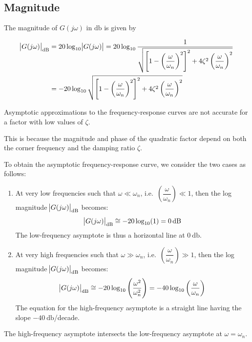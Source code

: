\documentclass[
  14pt,
  a4paper,
  oneside,
  open=any,
  a4paper,
  14pt]{report}
\begin{document}
\subsection{Magnitude}\label{magnitude-2}

The magnitude of \(G(j\omega)\) in \(\unit{\decibel}\) is given by

\[
\begin{aligned}
    \abs{G(j\omega)}_{\unit{\decibel}} &= 20\log_{10}\abs{G(j\omega)} = 20\log_{10}\dfrac{1}{\sqrt{\left[1-\left(\dfrac{\omega}{\omega_n}\right)^2 \right]^2 + 4\zeta^2\left(\dfrac{\omega}{\omega_n}\right)^2}} \\
    &= -20\log_{10}\sqrt{\left[1-\left(\dfrac{\omega}{\omega_n}\right)^2 \right]^2 + 4\zeta^2\left(\dfrac{\omega}{\omega_n}\right)^2}
\end{aligned}
\]

Asymptotic approximations to the frequency-response curves are not
accurate for a factor with low values of \(\zeta\).

This is because the magnitude and phase of the quadratic factor depend
on both the corner frequency and the damping ratio \(\zeta\).

To obtain the asymptotic frequency-response curve, we consider the two
cases as follows:

\begin{enumerate}
\def\labelenumi{\arabic{enumi}.}
\item
  At very low frequencies such that \(\omega \ll \omega_n\),
  i.e.~\(\left(\dfrac{\omega}{\omega_n}\right) \ll 1\), then the log
  magnitude \(\abs{G(j\omega)}_{\unit{\decibel}}\) becomes:\\
  \[
  \abs{G(j\omega)}_{\unit{\decibel}} \cong -20\log_{10}(1) = \SI{0}{\decibel}
  \] The low-frequency asymptote is thus a horizontal line at
  \(\SI{0}{\decibel}\).
\item
  At very high frequencies such that \(\omega \gg \omega_n\),
  i.e.~\(\left(\dfrac{\omega}{\omega_n}\right) \gg 1\), then the log
  magnitude \(\abs{G(j\omega)}_{\unit{\decibel}}\) becomes:\\
  \[
   \abs{G(j\omega)}_{\unit{\decibel}} \cong -20\log_{10}\left(\dfrac{\omega^2}{\omega_n^2}\right) = -40\log_{10}\left(\dfrac{\omega}{\omega_n}\right)
  \] The equation for the high-frequency asymptote is a straight line
  having the slope \(\SI{-40}{\decibel}\)/decade.
\end{enumerate}

The high-frequency asymptote intersects the low-frequency asymptote at
\(\omega = \omega_n\).
\end{document}
